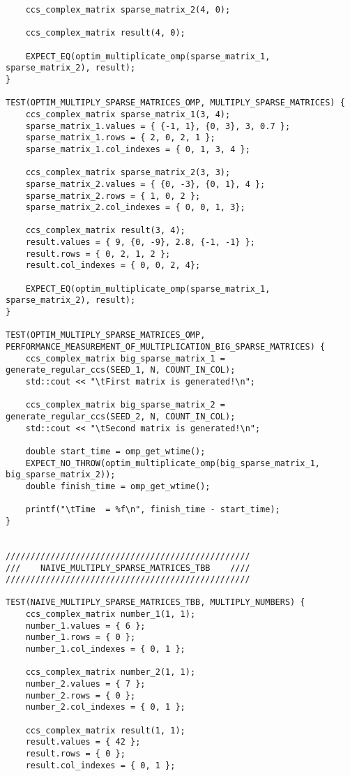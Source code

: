 \documentclass{report}
\begin{document}
\begin{itemize}
\begin{itemize}
\begin{lstlisting}
    ccs_complex_matrix sparse_matrix_2(4, 0);

    ccs_complex_matrix result(4, 0);

    EXPECT_EQ(optim_multiplicate_omp(sparse_matrix_1, sparse_matrix_2), result);
}

TEST(OPTIM_MULTIPLY_SPARSE_MATRICES_OMP, MULTIPLY_SPARSE_MATRICES) {
    ccs_complex_matrix sparse_matrix_1(3, 4);
    sparse_matrix_1.values = { {-1, 1}, {0, 3}, 3, 0.7 };
    sparse_matrix_1.rows = { 2, 0, 2, 1 };
    sparse_matrix_1.col_indexes = { 0, 1, 3, 4 };

    ccs_complex_matrix sparse_matrix_2(3, 3);
    sparse_matrix_2.values = { {0, -3}, {0, 1}, 4 };
    sparse_matrix_2.rows = { 1, 0, 2 };
    sparse_matrix_2.col_indexes = { 0, 0, 1, 3};

    ccs_complex_matrix result(3, 4);
    result.values = { 9, {0, -9}, 2.8, {-1, -1} };
    result.rows = { 0, 2, 1, 2 };
    result.col_indexes = { 0, 0, 2, 4};

    EXPECT_EQ(optim_multiplicate_omp(sparse_matrix_1, sparse_matrix_2), result);
}

TEST(OPTIM_MULTIPLY_SPARSE_MATRICES_OMP, PERFORMANCE_MEASUREMENT_OF_MULTIPLICATION_BIG_SPARSE_MATRICES) {
    ccs_complex_matrix big_sparse_matrix_1 = generate_regular_ccs(SEED_1, N, COUNT_IN_COL);
    std::cout << "\tFirst matrix is generated!\n";

    ccs_complex_matrix big_sparse_matrix_2 = generate_regular_ccs(SEED_2, N, COUNT_IN_COL);
    std::cout << "\tSecond matrix is generated!\n";

    double start_time = omp_get_wtime();
    EXPECT_NO_THROW(optim_multiplicate_omp(big_sparse_matrix_1, big_sparse_matrix_2));
    double finish_time = omp_get_wtime();

    printf("\tTime  = %f\n", finish_time - start_time);
}


/////////////////////////////////////////////////
///    NAIVE_MULTIPLY_SPARSE_MATRICES_TBB    ////
/////////////////////////////////////////////////

TEST(NAIVE_MULTIPLY_SPARSE_MATRICES_TBB, MULTIPLY_NUMBERS) {
    ccs_complex_matrix number_1(1, 1);
    number_1.values = { 6 };
    number_1.rows = { 0 };
    number_1.col_indexes = { 0, 1 };

    ccs_complex_matrix number_2(1, 1);
    number_2.values = { 7 };
    number_2.rows = { 0 };
    number_2.col_indexes = { 0, 1 };

    ccs_complex_matrix result(1, 1);
    result.values = { 42 };
    result.rows = { 0 };
    result.col_indexes = { 0, 1 };


\end{lstlisting}
\end{itemize}
\end{itemize}
\end{document}
